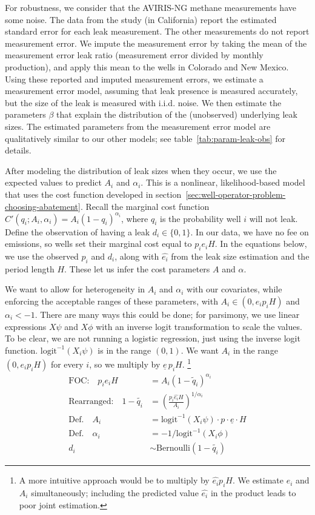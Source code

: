 \documentclass[12pt,oneside,letterpaper]{article}
\theoremstyle{definition}
\begin{document}
\begin{refsection}
For robustness, we consider that the \gls{AVIRIS-NG} methane measurements have some noise.
The data from the \textcite{Duren/etal:2019} study (in California) report the estimated standard error for each leak measurement.
The other measurements do not report measurement error.
We impute the measurement error by taking the mean of the measurement error leak ratio (measurement error divided by monthly production), and apply this mean to the wells in Colorado and New Mexico.
Using these reported and imputed measurement errors, we estimate a measurement error model, assuming that leak presence is measured accurately, but the size of the leak is measured with \gls{i.i.d.} noise.
We then estimate the parameters \(\beta\) that explain the distribution of the (unobserved) underlying leak sizes.
The estimated parameters from the measurement error model are qualitatively similar to our other models; see table~\ref{tab:param-leak-obs} for details.


After modeling the distribution of leak sizes when they occur, we use the expected values to predict \(A_i\) and \(\alpha_i\).
This is a nonlinear, likelihood-based model that uses the cost function developed in section~\ref{sec:well-operator-problem-choosing-abatement}.
Recall the marginal cost function \(C'(q_i; A_i, \alpha_i) = A_i (1 - q_i)^{\alpha_i}\), where \(q_i\) is the probability well \(i\) will not leak.
Define the observation of having a leak \(d_i \in \{0, 1\}\).
In our data, we have no fee on emissions, so wells set their marginal cost equal to \(p_i e_i H\).
In the equations below, we use the observed \(p_i\) and \(d_i\), along with \(\hat{e_i}\) from the leak size estimation and the period length \(H\).
These let us infer the cost parameters \(A\) and \(\alpha\).

We want to allow for heterogeneity in \(A_i\) and \(\alpha_i\) with our covariates, while enforcing the acceptable ranges of these parameters, with \(A_i \in (0, e_i p_i H)\) and \(\alpha_i < -1\).
There are many ways this could be done;
for parsimony, we use linear expressions \(X \psi\) and \(X\phi\) with an inverse logit transformation to scale the values.
To be clear, we are not running a logistic regression, just using the inverse logit function.
\(\text{logit}^{-1}(X_i\psi)\) is in the range \((0, 1)\).
We want \(A_i\) in the range \((0, e_i p_i H)\) for every \(i\), so we multiply by \(\underline{e}\, p_i H\).%
\footnote{A more intuitive approach would be to multiply by \(\hat{e_i} p_i H\).
We estimate \(e_i\) and \(A_i\) simultaneously;
including the predicted value \(\hat{e_i}\) in the product leads to poor joint estimation.}
\begin{align*}
\text{FOC:}\quad p_i e_i H &= A_i (1 - \tilde{q}_i)^{\alpha_i}\\
\text{Rearranged:}\quad 1 - \tilde{q_i} &= \left(\frac{p_i \hat{e_i}H}{A_i}\right) ^{1 / \alpha_i}\\
\text{Def.} \quad A_i &= \text{logit}^{-1}(X_i\psi) \cdot p \cdot \underline{e} \cdot H\\
\text{Def.} \quad \alpha_i &= -1 / \text{logit}^{-1}(X_i\phi)\\
d_i &\sim \text{Bernoulli}(1 - \tilde{q_i})
\end{align*}


\end{refsection}
\end{document}
